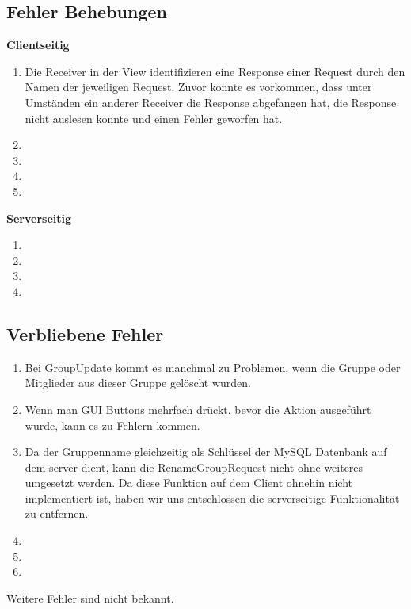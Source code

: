 \subsection{Fehler Behebungen}
	\textbf{Clientseitig}
	\begin{enumerate}
		\item Die Receiver in der View identifizieren eine Response einer Request durch den Namen der jeweiligen Request. Zuvor konnte es vorkommen, dass unter Umständen ein anderer Receiver die Response abgefangen hat, die Response nicht auslesen konnte und einen Fehler geworfen hat.
		\item
		\item
		\item
		\item
	\end{enumerate}

	\textbf{Serverseitig}
	\begin{enumerate}
		\item
		\item
		\item
		\item
	\end{enumerate}

\subsection{Verbliebene Fehler}
	\begin{enumerate}
		\item Bei GroupUpdate kommt es manchmal zu Problemen, wenn die Gruppe oder Mitglieder aus dieser Gruppe gelöscht wurden.
		\item Wenn man GUI Buttons mehrfach drückt, bevor die Aktion ausgeführt wurde, kann es zu Fehlern kommen.
		\item Da der Gruppenname gleichzeitig als Schlüssel der MySQL Datenbank auf dem server dient, kann die RenameGroupRequest nicht ohne weiteres umgesetzt werden. Da diese Funktion auf dem Client ohnehin nicht implementiert ist, haben wir uns entschlossen die serverseitige Funktionalität zu entfernen.
		\item
		\item
		\item
	\end{enumerate}

	Weitere Fehler sind nicht bekannt.
